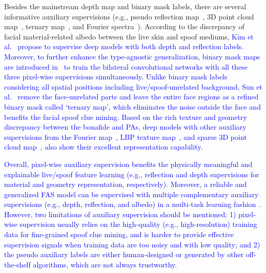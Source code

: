 \documentclass[10pt,journal,compsoc]{IEEEtran}
\begin{document}








 Besides the mainstream depth map and binary mask labels, there are several informative auxiliary supervisions (e.g., pseudo reflection map~\cite{kim2019basn,yu2020face,zhang2020celeba}, 3D point cloud map~\cite{li3dpc}, ternary map~\cite{sun2020face}, and Fourier spectra~\cite{roy2021bi}). According to the discrepancy of facial material-related albedo between the live skin and spoof mediums, \textcolor{blue}{Kim et al.~\cite{kim2019basn} propose to supervise deep models with both depth and reflection labels. Moreover, to further enhance the type-agnostic generalization, binary mask maps are introduced in~\cite{yu2020face} to train the bilateral convolutional networks with all these three pixel-wise supervisions simultaneously. Unlike binary mask labels considering all spatial positions including live/spoof-unrelated background, Sun et al.~\cite{sun2020face} remove the face-unrelated parts and leave the entire face regions as a refined binary mask called `ternary map', which eliminates the noise outside the face and benefits the facial spoof clue mining. Based on the rich texture and geometry discrepancy between the bonafide and PAs, deep models with other auxiliary supervisions from the Fourier map~\cite{jourabloo2018face,roy2021bi}, LBP texture map~\cite{zhang2020face}, and sparse 3D point cloud map~\cite{li3dpc}, also show their excellent representation capability. } 


\textcolor{blue}{Overall, pixel-wise auxiliary supervision benefits the physically meaningful and explainable live/spoof feature learning (e.g., reflection and depth supervisions for material and geometry representation, respectively). Moreover, a reliable and generalized FAS model can be supervised with multiple complementary auxiliary supervisions (e.g., depth, reflection, and albedo) in a multi-task learning fashion~\cite{yu2020face}. However, two limitations of auxiliary supervision should be mentioned: 1) pixel-wise supervision usually relies on the high-quality (e.g., high-resolution) training data for fine-grained spoof clue mining, and is harder to provide effective supervision signals when training data are too noisy and with low quality; and 2) the pseudo auxiliary labels are either human-designed or generated by other off-the-shelf algorithms, which are not always trustworthy. }
\end{document}
